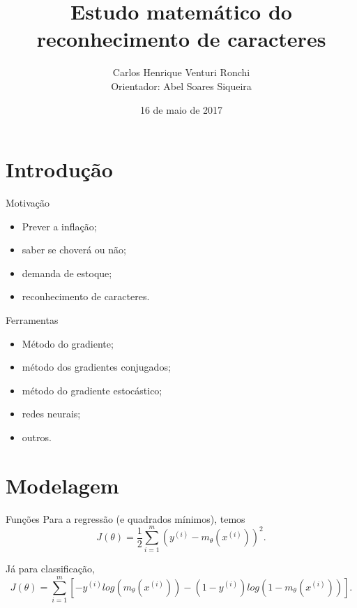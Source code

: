 \documentclass{beamer}
\title{Estudo matemático do reconhecimento
de caracteres}
\author[Carlos Ronchi]{Carlos Henrique Venturi Ronchi\\{\small Orientador: Abel Soares Siqueira}}
\date{16 de maio de 2017}
\institute{Universidade Federal do Paraná - UFPR}
\begin{document}
\begin{frame}
    \titlepage
\end{frame}

\begin{frame}
    \tableofcontents
\end{frame}

\section{Introdução}
    \begin{frame}{Motivação}
        \begin{itemize}
            \item Prever a inflação;
            \item saber se choverá ou não;
            \item demanda de estoque;
            \item reconhecimento de caracteres.
        \end{itemize}
    \end{frame}

    \begin{frame}{Ferramentas}
        \begin{itemize}
            \item Método do gradiente;
            \item método dos gradientes conjugados;
            \item método do gradiente estocástico;
            \item redes neurais;
            \item outros.
        \end{itemize}
    \end{frame}

\section{Modelagem}

    \begin{frame}{Funções}
        Para a regressão (e quadrados mínimos), temos
        \begin{equation*}
            J(\theta) = \frac{1}{2} \sum_{i=1}^{m}(y^{(i)}- m_\theta(x^{(i)}))^2.
        \end{equation*}

        Já para classificação,
        \begin{equation*}
            J(\theta) = \sum_{i=1}^{m}\left[-y^{(i)}log(m_\theta(x^{(i)})) - (1-y^{(i)})log(1-m_\theta(x^{(i)}))\right].
        \end{equation*}
    \end{frame}
\end{document}
